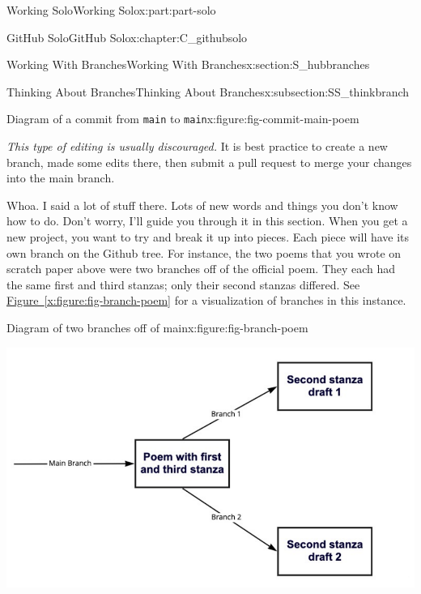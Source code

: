 \documentclass[oneside,10pt,]{book}
\newcommand{\xreffont}{\relax}
\newcommand{\mono}[1]{\texttt{#1}}
\begin{document}
\begin{partptx}{Working Solo}{}{Working Solo}{}{}{x:part:part-solo}
\begin{chapterptx}{GitHub Solo}{}{GitHub Solo}{}{}{x:chapter:C_githubsolo}
\begin{sectionptx}{Working With Branches}{}{Working With Branches}{}{}{x:section:S_hubbranches}
\begin{subsectionptx}{Thinking About Branches}{}{Thinking About Branches}{}{}{x:subsection:SS_thinkbranch}
\begin{figureptx}{Diagram of a commit from \mono{main} to \mono{main}}{x:figure:fig-commit-main-poem}{}
\tcblower
\end{figureptx}%
\emph{This type of editing is usually discouraged.} It is best practice to create a new branch, made some edits there, then submit a pull request to merge your changes into the main branch.%
\par
Whoa. I said a lot of stuff there. Lots of new words and things you don't know how to do. Don't worry, I'll guide you through it in this section. When you get a new project, you want to try and break it up into pieces. Each piece will have its own branch on the Github tree. For instance, the two poems that you wrote on scratch paper above were two branches off of the official poem. They each had the same first and third stanzas; only their second stanzas differed. See \hyperref[x:figure:fig-branch-poem]{Figure~{\xreffont\ref{x:figure:fig-branch-poem}}} for a visualization of branches in this instance.%
\begin{figureptx}{Diagram of two branches off of main}{x:figure:fig-branch-poem}{}%
\begin{image}{0}{1}{0}%
\includegraphics[width=\linewidth]{external/branch_poem.pdf}
\end{image}%
\tcblower
\end{figureptx}%

\end{subsectionptx}
\end{sectionptx}
\end{chapterptx}
\end{partptx}
\end{document}
